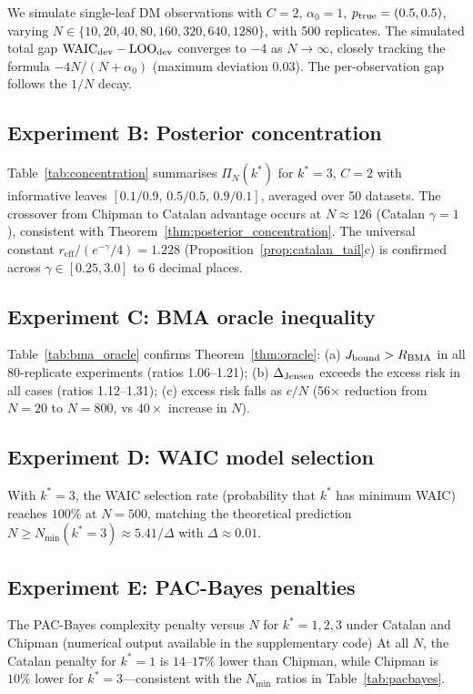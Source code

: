 \documentclass[ba]{imsart}
\theoremstyle{plain}
\theoremstyle{definition}
\theoremstyle{remark}
\newcommand{\waic}{\mathrm{WAIC}}
\newcommand{\loo}{\mathrm{LOO}}
\newcommand{\Nmin}{N_{\min}}
\newcommand{\reff}{r_{\mathrm{eff}}}
\newcommand{\Rbma}{R_{\mathrm{BMA}}}
\begin{document}
We simulate single-leaf DM observations with $C=2$, $\alpha_0=1$,
$p_{\rm true}=(0.5,0.5)$, varying $N \in \{10,20,40,80,160,320,640,1280\}$,
with 500 replicates.
The simulated total gap $\waic_{\rm dev} - \loo_{\rm dev}$ converges to $-4$ as $N\to\infty$,
closely tracking the formula $-4N/(N+\alpha_0)$ (maximum deviation $0.03$).
The per-observation gap follows the $1/N$ decay.

\subsection{Experiment B: Posterior concentration}

Table~\ref{tab:concentration} summarises $\Pi_N(k^*)$ for $k^*=3$, $C=2$
with informative leaves $[0.1/0.9,\,0.5/0.5,\,0.9/0.1]$, averaged over 50 datasets.
The crossover from Chipman to Catalan advantage occurs at $N\approx 126$
(Catalan $\gamma=1$), consistent with Theorem~\ref{thm:posterior_concentration}.
The universal constant $\reff/(e^{-\gamma}/4) = 1.228$ (Proposition~\ref{prop:catalan_tail}c)
is confirmed across $\gamma \in [0.25, 3.0]$ to $6$ decimal places.

\subsection{Experiment C: BMA oracle inequality}

Table~\ref{tab:bma_oracle} confirms Theorem~\ref{thm:oracle}:
(a) $J_{\rm bound} > \Rbma$ in all 80-replicate experiments (ratios 1.06--1.21);
(b) $\Delta_{\rm Jensen}$ exceeds the excess risk in all cases (ratios 1.12--1.31);
(c) excess risk falls as $c/N$ (56$\times$ reduction from $N=20$ to $N=800$,
vs $40\times$ increase in $N$).

\subsection{Experiment D: WAIC model selection}

With $k^*=3$, the WAIC selection rate (probability that $k^*$ has minimum WAIC)
reaches $100\%$ at $N=500$, matching the theoretical prediction
$N \geq \Nmin(k^*=3) \approx 5.41/\Delta$ with $\Delta \approx 0.01$.

\subsection{Experiment E: PAC-Bayes penalties}

The PAC-Bayes complexity penalty versus $N$ for $k^*=1,2,3$
under Catalan and Chipman (numerical output available in the supplementary code)
At all $N$, the Catalan penalty for $k^*=1$ is $14$--$17\%$ lower than Chipman,
while Chipman is $10\%$ lower for $k^*=3$---consistent with the $\Nmin$ ratios
in Table~\ref{tab:pacbayes}.
\end{document}
